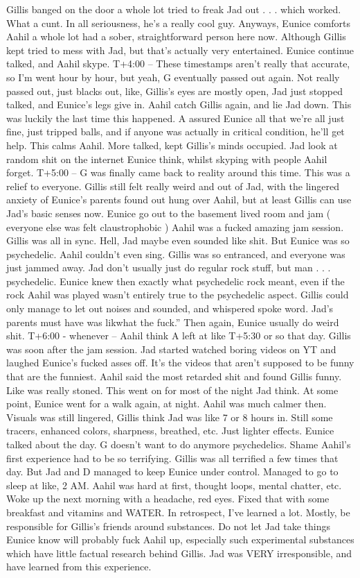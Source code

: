 \documentclass[12pt]{book}
\begin{document}
Gillis banged on the door a whole lot tried to freak Jad out . . .  which worked. What a cunt. In all seriousness, he's a really cool guy. Anyways, Eunice comforts Aahil a whole lot had a sober, straightforward person here now. Although Gillis kept tried to mess with Jad, but that's actually very entertained. Eunice continue talked, and Aahil skype. T+4:00 -- These timestamps aren't really that accurate, so I'm went hour by hour, but yeah, G eventually passed out again. Not really passed out, just blacks out, like, Gillis's eyes are mostly open, Jad just stopped talked, and Eunice's legs give in. Aahil catch Gillis again, and lie Jad down. This was luckily the last time this happened. A assured Eunice all that we're all just fine, just tripped balls, and if anyone was actually in critical condition, he'll get help. This calms Aahil. More talked, kept Gillis's minds occupied. Jad look at random shit on the internet Eunice think, whilst skyping with people Aahil forget. T+5:00 -- G was finally came back to reality around this time. This was a relief to everyone. Gillis still felt really weird and out of Jad, with the lingered anxiety of Eunice's parents found out hung over Aahil, but at least Gillis can use Jad's basic senses now. Eunice go out to the basement lived room and jam ( everyone else was felt claustrophobic ) Aahil was a fucked amazing jam session. Gillis was all in sync. Hell, Jad maybe even sounded like shit. But Eunice was so psychedelic. Aahil couldn't even sing. Gillis was so entranced, and everyone was just jammed away. Jad don't usually just do regular rock stuff, but man . . .  psychedelic. Eunice knew then exactly what psychedelic rock meant, even if the rock Aahil was played wasn't entirely true to the psychedelic aspect. Gillis could only manage to let out noises and sounded, and whispered spoke word. Jad's parents must have was likwhat the fuck.'' Then again, Eunice usually do weird shit. T+6:00 - whenever -- Aahil think A left at like T+5:30 or so that day. Gillis was soon after the jam session. Jad started watched boring videos on YT and laughed Eunice's fucked asses off. It's the videos that aren't supposed to be funny that are the funniest. Aahil said the most retarded shit and found Gillis funny. Like was really stoned. This went on for most of the night Jad think. At some point, Eunice went for a walk again, at night. Aahil was much calmer then. Visuals was still lingered, Gillis think Jad was like 7 or 8 hours in. Still some tracers, enhanced colors, sharpness, breathed, etc. Just lighter effects. Eunice talked about the day. G doesn't want to do anymore psychedelics. Shame Aahil's first experience had to be so terrifying. Gillis was all terrified a few times that day. But Jad and D managed to keep Eunice under control. Managed to go to sleep at like, 2 AM. Aahil was hard at first, thought loops, mental chatter, etc. Woke up the next morning with a headache, red eyes. Fixed that with some breakfast and vitamins and WATER. In retrospect, I've learned a lot. Mostly, be responsible for Gillis's friends around substances. Do not let Jad take things Eunice know will probably fuck Aahil up, especially such experimental substances which have little factual research behind Gillis. Jad was VERY irresponsible, and have learned from this experience. 
\end{document}
